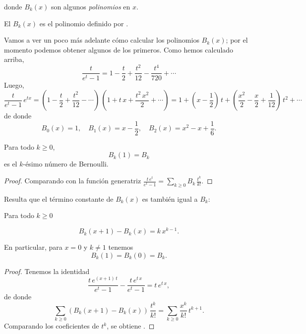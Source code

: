 \documentclass{article}
\begin{document}
\noindent donde $B_k (x)$ son algunos \emph{polinomios} en $x$.

\begin{definicion*}
El  $B_k (x)$ es el polinomio definido por .
\end{definicion*}

\begin{ejemplo*}
Vamos a ver un poco más adelante cómo calcular los polinomios $B_k (x)$; por el momento podemos obtener algunos de los primeros. Como hemos calculado arriba,
$$\frac{t}{e^t - 1} = 1 - \frac{t}{2} + \frac{t^2}{12} - \frac{t^4}{720} + \cdots$$
Luego,
$$\frac{t}{e^t - 1} \, e^{tx} = \left(1 - \frac{t}{2} + \frac{t^2}{12} - \cdots\right) \, \left(1 + t\,x + \frac{t^2\,x^2}{2} + \cdots\right) = 1 + \left(x - \frac{1}{2}\right)\,t + \left(\frac{x^2}{2} - \frac{x}{2} + \frac{1}{12}\right)\,t^2 + \cdots$$
de donde
$$B_0 (x) = 1, \quad B_1 (x) = x - \frac{1}{2}, \quad B_2 (x) = x^2 - x + \frac{1}{6}.$$
\end{ejemplo*}

\begin{observacion*}
Para todo $k\ge 0$,
$$B_k (1) = B_k$$
es el $k$-ésimo número de Bernoulli.

\begin{proof}
Comparando  con la función generatriz $\frac{t\,e^t}{e^t-1} = \sum_{k \ge 0} B_k\,\frac{t^k}{k!}$.
\end{proof}
\end{observacion*}

Resulta que el término constante de $B_k (x)$ es también igual a $B_k$:

\begin{observacion*}
Para todo $k \ge 0$

\begin{equation}
\label{Bk(x+1)-y-Bk(x)}
B_k (x+1) - B_k (x) = k\,x^{k-1}.
\end{equation}

En particular, para $x = 0$ y $k \ne 1$ tenemos
$$B_k (1) = B_k (0) = B_k.$$

\begin{proof}
Tenemos la identidad
$$\frac{t\,e^{(x+1)\,t}}{e^t-1} - \frac{t\,e^{t\,x}}{e^t-1} = t\,e^{t\,x},$$
de donde
$$\sum_{k\ge 0} (B_k (x+1) - B_k (x))\,\frac{t^k}{k!} = \sum_{k \ge 0} \frac{x^k}{k!}\,t^{k+1}.$$
Comparando los coeficientes de $t^k$, se obtiene .
\end{proof}
\end{observacion*}
\end{document}
